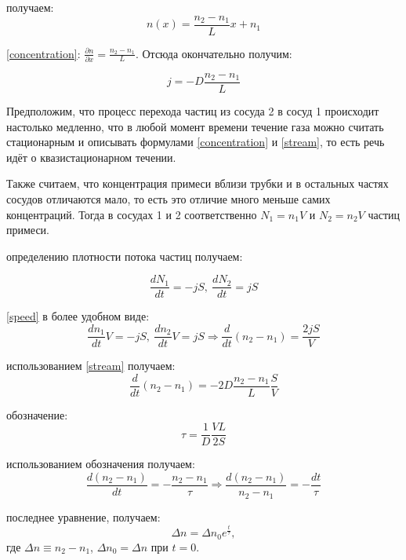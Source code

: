 \documentclass[15pt,a5paper,reqno]{article}
\begin{document}
     получаем:
	\begin{equation}\label{concentration}
	    n(x) = \frac{n_2 - n_1}{L}x + n_1
	\end{equation}
	
	 \eqref{concentration}: $\frac{\partial n}{\partial x} = \frac{n_2 - n_1}{L}$. Отсюда окончательно получим:
	
	\begin{equation}\label{stream}
	    j = -D\frac{n_2 - n_1}{L}
	\end{equation}
	
	Предположим, что процесс перехода частиц из сосуда 2 в сосуд 1 происходит настолько медленно, что в любой момент времени течение газа можно считать стационарным и описывать формулами \eqref{concentration} и \eqref{stream}, то есть речь идёт о квазистационарном течении.
	
	Также считаем, что концентрация примеси вблизи трубки и в остальных частях сосудов отличаются мало, то есть это отличие много меньше самих концентраций. Тогда в сосудах 1 и 2 соответственно $N_1 = n_1V$ и $N_2 = n_2V$ частиц примеси.
	
	 определению плотности потока частиц получаем:
	
	\begin{equation}\label{speed}
	    \frac{dN_1}{dt} = -jS,\>\frac{dN_2}{dt} = jS
	\end{equation}
	
	 \eqref{speed} в более удобном виде:
	\[\frac{dn_1}{dt}V = -jS,\>\frac{dn_2}{dt}V = jS \Rightarrow \frac{d}{dt}(n_2 - n_1) = \frac{2jS}{V}\]
	
     использованием \eqref{stream} получаем:
    \[\frac{d}{dt}(n_2 - n_1) = -2D\frac{n_2 - n_1}{L}\frac{S}{V}\]
    
     обозначение: 
    \begin{equation}\label{relax_time}
        \tau = \frac{1}{D}\frac{VL}{2S}
    \end{equation}
    
     использованием обозначения получаем:
    \[\frac{d(n_2 - n_1)}{dt} = -\frac{n_2 - n_1}{\tau} \Rightarrow \frac{d(n_2  - n_1)}{n_2 - n_1} = -\frac{dt}{\tau}\]
    
     последнее уравнение, получаем:
    \begin{equation}
        \Delta n = \Delta n_0 e^{\frac{t}{\tau}},
    \end{equation}
    где $\Delta n \equiv n_2 - n_1$, $\Delta n_0 = \Delta n$ при $t = 0$.
    
\end{document}
